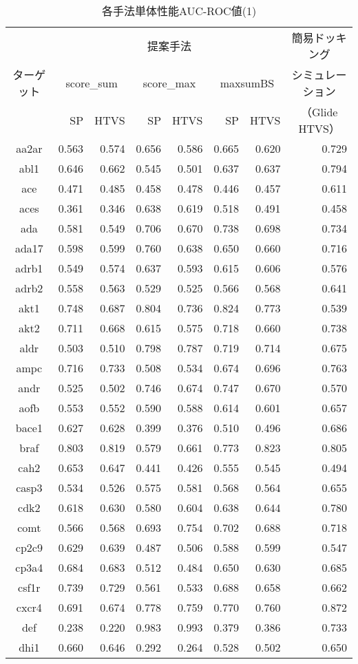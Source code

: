 \begin{table}[t] \centering
	\caption{各手法単体性能AUC-ROC値(1)}
	\label{table:auc:1}
	\begin{tabular}{c|rrrrrr|r}
	\hline
		&\multicolumn{6}{c|}{提案手法}&\multicolumn{1}{c}{簡易ドッキング} \\
ターゲット	&\multicolumn{2}{c}{score\_sum}&\multicolumn{2}{c}{score\_max}&\multicolumn{2}{c|}{maxsumBS}&\multicolumn{1}{c}{シミュレーション} \\
		&SP&HTVS&SP&HTVS&SP&HTVS&\multicolumn{1}{c}{（Glide HTVS）} \\
\hline
aa2ar&0.563&0.574&0.656&0.586&0.665&0.620&0.729 \\
abl1&0.646&0.662&0.545&0.501&0.637&0.637&0.794 \\
ace&0.471&0.485&0.458&0.478&0.446&0.457&0.611 \\
aces&0.361&0.346&0.638&0.619&0.518&0.491&0.458 \\
ada&0.581&0.549&0.706&0.670&0.738&0.698&0.734 \\
ada17&0.598&0.599&0.760&0.638&0.650&0.660&0.716 \\
adrb1&0.549&0.574&0.637&0.593&0.615&0.606&0.576 \\
adrb2&0.558&0.563&0.529&0.525&0.566&0.568&0.641 \\
akt1&0.748&0.687&0.804&0.736&0.824&0.773&0.539 \\
akt2&0.711&0.668&0.615&0.575&0.718&0.660&0.738 \\
aldr&0.503&0.510&0.798&0.787&0.719&0.714&0.675 \\
ampc&0.716&0.733&0.508&0.534&0.674&0.696&0.763 \\
andr&0.525&0.502&0.746&0.674&0.747&0.670&0.570 \\
aofb&0.553&0.552&0.590&0.588&0.614&0.601&0.657 \\
bace1&0.627&0.628&0.399&0.376&0.510&0.496&0.686 \\
braf&0.803&0.819&0.579&0.661&0.773&0.823&0.805 \\
cah2&0.653&0.647&0.441&0.426&0.555&0.545&0.494 \\
casp3&0.534&0.526&0.575&0.581&0.568&0.564&0.655 \\
cdk2&0.618&0.630&0.580&0.604&0.638&0.644&0.780 \\
comt&0.566&0.568&0.693&0.754&0.702&0.688&0.718 \\
cp2c9&0.629&0.639&0.487&0.506&0.588&0.599&0.547 \\
cp3a4&0.684&0.683&0.512&0.484&0.650&0.630&0.685 \\
csf1r&0.739&0.729&0.561&0.533&0.688&0.658&0.662 \\
cxcr4&0.691&0.674&0.778&0.759&0.770&0.760&0.872 \\
def&0.238&0.220&0.983&0.993&0.379&0.386&0.733 \\
dhi1&0.660&0.646&0.292&0.264&0.528&0.502&0.650 \\
\hline
	\end{tabular}
\end{table}
